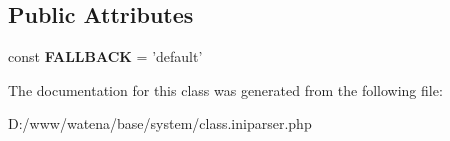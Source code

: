 \subsection*{Public Attributes}
\begin{DoxyCompactItemize}
\item 
\hypertarget{class_ini_parser_ad6689e358feec5e32df63f6409b43145}{const {\bfseries F\-A\-L\-L\-B\-A\-C\-K} = 'default'}\label{class_ini_parser_ad6689e358feec5e32df63f6409b43145}

\end{DoxyCompactItemize}


The documentation for this class was generated from the following file\-:\begin{DoxyCompactItemize}
\item 
D\-:/www/watena/base/system/class.\-iniparser.\-php\end{DoxyCompactItemize}
